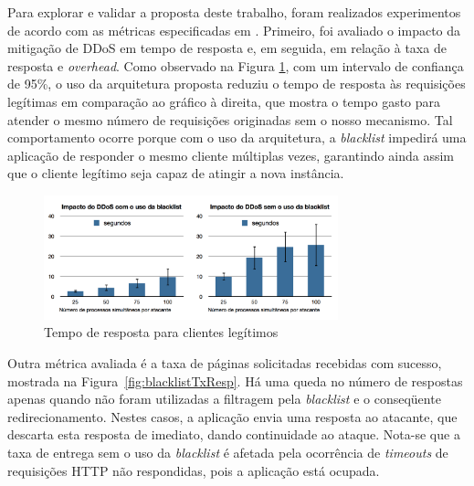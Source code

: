 


Para explorar e validar a proposta deste trabalho, foram realizados experimentos de acordo com as métricas especificadas em \cite{4600003}. Primeiro, foi avaliado o impacto da mitigação de DDoS em tempo de resposta e, em seguida, em relação à taxa de resposta e \emph{overhead}. 
%
%
Como observado na Figura \ref{fig:blacklistSecs}, com um intervalo de confiança de 95\%, o uso da arquitetura proposta reduziu o tempo de resposta às requisições legítimas em comparação ao gráfico à direita, que mostra o tempo gasto para atender o mesmo número de requisições originadas sem o nosso mecanismo. Tal comportamento ocorre porque com o uso da arquitetura, a \emph{blacklist} impedirá uma aplicação de responder o mesmo cliente múltiplas vezes, garantindo ainda assim que o cliente legítimo seja capaz de atingir a nova instância.

\begin{figure}[h!]
\centering
\includegraphics[width=0.76\textwidth]{images/blacklistSecs.png}
\caption{Tempo de resposta para clientes legítimos}
\label{fig:blacklistSecs}
\end{figure}




Outra métrica avaliada é a taxa de páginas solicitadas recebidas com sucesso, mostrada na Figura~\ref{fig:blacklistTxResp}. Há uma queda no número de respostas apenas quando não foram utilizadas a filtragem pela \emph{blacklist} e o conseqüente redirecionamento. Nestes casos, a aplicação envia uma resposta ao atacante, que descarta esta resposta de imediato, dando continuidade ao ataque. Nota-se que a taxa de entrega sem o uso da \emph{blacklist} é afetada pela ocorrência de \emph{timeouts} de requisições HTTP não respondidas, pois a aplicação está ocupada.



